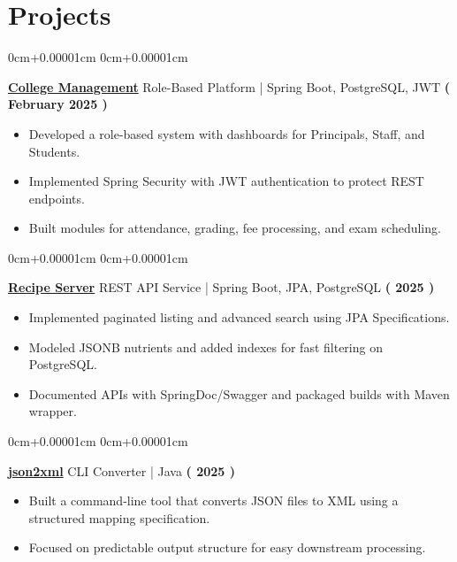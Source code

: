 \documentclass[10pt,a4paper]{article}
\newenvironment{highlights}{
    \begin{itemize}[
        topsep=0.10cm,
        parsep=0.10cm,
        partopsep=0pt,
        itemsep=0pt,
        leftmargin=10pt,
    ]
    }{
    \end{itemize}
}
\newenvironment{onecolentry}{
    \begin{adjustwidth}{
        0cm+0.00001cm
    }{
        0cm+0.00001cm
    }
    }{
    \end{adjustwidth}
}
\begin{document}
    \section{Projects}\label{sec:projects}
    \begin{onecolentry}
        \textbf{\href{https://github.com/jefino9488/college-management-server}{College Management}} Role-Based Platform | Spring Boot, PostgreSQL, JWT \hfill \textbf{( February 2025 )} \\
        \begin{highlights}
            \item Developed a role-based system with dashboards for Principals, Staff, and Students.
            \item Implemented Spring Security with JWT authentication to protect REST endpoints.
            \item Built modules for attendance, grading, fee processing, and exam scheduling.
        \end{highlights}
    \end{onecolentry}
    \vspace{0.1cm}
    \begin{onecolentry}
        \textbf{\href{https://github.com/Jefino9488/Recipe-Server}{Recipe Server}} REST API Service | Spring Boot, JPA, PostgreSQL \hfill \textbf{( 2025 )} \\
        \begin{highlights}
            \item Implemented paginated listing and advanced search using JPA Specifications.
            \item Modeled JSONB nutrients and added indexes for fast filtering on PostgreSQL.
            \item Documented APIs with SpringDoc/Swagger and packaged builds with Maven wrapper.
        \end{highlights}
    \end{onecolentry}
    \vspace{0.1cm}
    \begin{onecolentry}
        \textbf{\href{https://github.com/Jefino9488/json2xml}{json2xml}} CLI Converter | Java \hfill \textbf{( 2025 )} \\
        \begin{highlights}
            \item Built a command-line tool that converts JSON files to XML using a structured mapping specification.
            \item Focused on predictable output structure for easy downstream processing.
        \end{highlights}
    \end{onecolentry}
\end{document}
